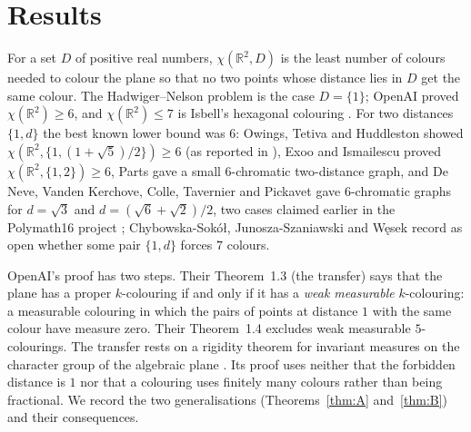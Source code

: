 \documentclass[11pt,a4paper]{amsart}
\theoremstyle{definition}
\theoremstyle{remark}
\newcommand{\R}{\mathbb{R}}
\begin{document}
\begin{abstract}
growth (this answers Erd\H{o}s Problem \#706). Davies has just proved the analogous statements in dimension at least $4$ by a different method. Using OpenAI's
theorem itself at a small scale and density bounds at a large one, we show that the distances $1$ and $N$ force at
least $25$ colours for every large algebraic $N$, although $19.01$ colours suffice fractionally, and, with de
Grey's graph, at least $18$ colours for every algebraic $N\ge10^{25}$; iterating, $k$ distances can force at least
$6\cdot4.0486^{k-1}$ colours. The density
bounds we use are linear-programming bounds of Oliveira Filho and Vallentin, which we certify in interval arithmetic,
and theorems of Bukh and of Ambrus, Csiszárik, Matolcsi, Varga and Zsámboki.
\end{abstract}

\maketitle

\section{Results}

For a set $D$ of positive real numbers, $\chi(\R^2,D)$ is the least number of colours needed to colour the plane so
that no two points whose distance lies in $D$ get the same colour. The Hadwiger--Nelson problem is the case
$D=\{1\}$; OpenAI \cite{OpenAI} proved $\chi(\R^2)\ge 6$, and $\chi(\R^2)\le 7$ is Isbell's hexagonal colouring
\cite{Soifer}. For two distances $\{1,d\}$ the best known lower bound was $6$: Owings, Tetiva and Huddleston
\cite{OTH} showed $\chi(\R^2,\{1,(1+\sqrt5)/2\})\ge6$ (as reported in \cite{CJW,DeNeve}), Exoo and Ismailescu
\cite{EI} proved $\chi(\R^2,\{1,2\})\ge 6$, Parts \cite{Parts} gave a small $6$-chromatic two-distance graph, and De
Neve, Vanden Kerchove, Colle, Tavernier and Pickavet \cite{DeNeve} gave $6$-chromatic graphs for $d=\sqrt3$ and
$d=(\sqrt6+\sqrt2)/2$, two cases claimed earlier in the Polymath16 project \cite{Polymath}; Chybowska-Sokół, Junosza-Szaniawski and Węsek \cite{CJW}
record as open whether some pair $\{1,d\}$ forces $7$ colours.

OpenAI's proof has two steps. Their Theorem~1.3 (the transfer) says that the plane has a proper $k$-colouring if and
only if it has a \emph{weak measurable} $k$-colouring: a measurable colouring in which the pairs of points at distance
$1$ with the same colour have measure zero. Their Theorem~1.4 excludes weak measurable $5$-colourings. The transfer
rests on a rigidity theorem for invariant measures on the character group of the algebraic plane
\cite[Thm.~2.3]{OpenAI}. Its proof uses neither that the forbidden distance is $1$ nor that a colouring uses finitely
many colours rather than being fractional. We record the two generalisations (Theorems~\ref{thm:A}
and~\ref{thm:B}) and their consequences.
\end{document}
